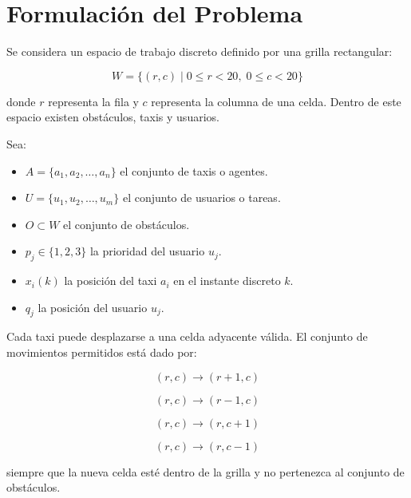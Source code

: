 \documentclass[12pt,a4paper]{article}
\begin{document}
\section{Formulación del Problema}
\justifying

Se considera un espacio de trabajo discreto definido por una grilla rectangular:

\begin{equation}
W = \{(r,c) \mid 0 \leq r < 20,\; 0 \leq c < 20\}
\end{equation}

donde $r$ representa la fila y $c$ representa la columna de una celda. Dentro de este espacio existen obstáculos, taxis y usuarios.

Sea:

\begin{itemize}
    \item $A = \{a_1,a_2,\dots,a_n\}$ el conjunto de taxis o agentes.
    \item $U = \{u_1,u_2,\dots,u_m\}$ el conjunto de usuarios o tareas.
    \item $O \subset W$ el conjunto de obstáculos.
    \item $p_j \in \{1,2,3\}$ la prioridad del usuario $u_j$.
    \item $x_i(k)$ la posición del taxi $a_i$ en el instante discreto $k$.
    \item $q_j$ la posición del usuario $u_j$.
\end{itemize}

Cada taxi puede desplazarse a una celda adyacente válida. El conjunto de movimientos permitidos está dado por:

\begin{equation}
(r,c) \rightarrow (r+1,c)
\end{equation}

\begin{equation}
(r,c) \rightarrow (r-1,c)
\end{equation}

\begin{equation}
(r,c) \rightarrow (r,c+1)
\end{equation}

\begin{equation}
(r,c) \rightarrow (r,c-1)
\end{equation}

siempre que la nueva celda esté dentro de la grilla y no pertenezca al conjunto de obstáculos.
\end{document}
